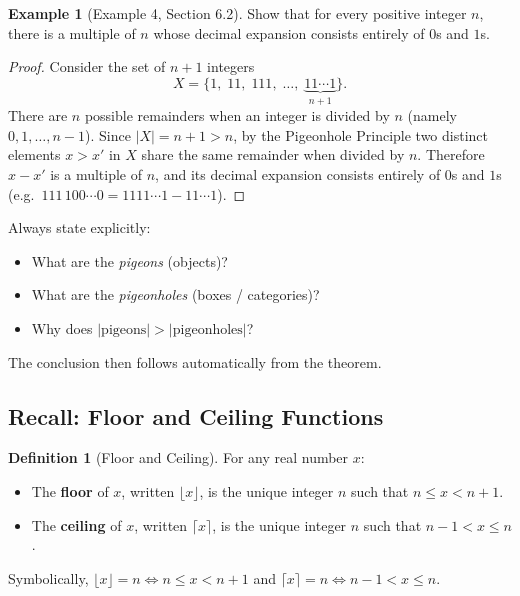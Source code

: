 \documentclass[11pt, a4paper, notitlepage]{report}
\theoremstyle{definition}
\newtheorem{definition}[theorem]{Definition}
\newtheorem{example}[theorem]{Example}
\theoremstyle{remark}
\begin{document}
\begin{example}[Example 4, Section 6.2]
Show that for every positive integer $n$, there is a multiple of $n$ whose decimal expansion
consists entirely of $0$s and $1$s.
\end{example}

\begin{proof}
Consider the set of $n+1$ integers
\[
  X = \{1,\; 11,\; 111,\; \ldots,\; \underbrace{11\cdots 1}_{n+1}\}.
\]
There are $n$ possible remainders when an integer is divided by $n$ (namely $0, 1, \ldots, n-1$).
Since $|X| = n+1 > n$, by the Pigeonhole Principle two distinct elements $x > x'$ in $X$ share the
same remainder when divided by $n$. Therefore $x - x'$ is a multiple of $n$, and its decimal
expansion consists entirely of $0$s and $1$s (e.g.\ $111\,100\cdots 0 = 1111\cdots 1 - 11\cdots 1$).
\end{proof}

\begin{examtip}[title={Exam Tip: Identifying Pigeons and Pigeonholes}]
Always state explicitly:
\begin{itemize}
  \item What are the \emph{pigeons} (objects)?
  \item What are the \emph{pigeonholes} (boxes / categories)?
  \item Why does $|\text{pigeons}| > |\text{pigeonholes}|$?
\end{itemize}
The conclusion then follows automatically from the theorem.
\end{examtip}

\subsection{Recall: Floor and Ceiling Functions}

\begin{definition}[Floor and Ceiling]
\label{def:floor-ceiling}
For any real number $x$:
\begin{itemize}
  \item The \textbf{floor} of $x$, written $\lfloor x \rfloor$, is the unique integer $n$ such
        that $n \leq x < n+1$.
  \item The \textbf{ceiling} of $x$, written $\lceil x \rceil$, is the unique integer $n$ such
        that $n-1 < x \leq n$.
\end{itemize}
Symbolically, $\lfloor x \rfloor = n \iff n \leq x < n+1$ and
$\lceil x \rceil = n \iff n-1 < x \leq n$.
\end{definition}
\end{document}
